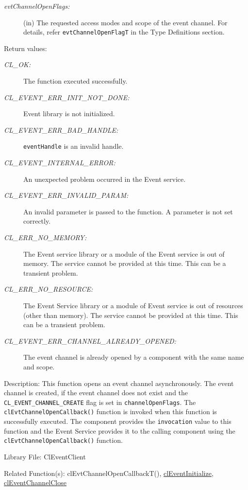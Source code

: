 \begin{flushleft}
\begin{Desc}
\begin{description}
\item[{\em evt\-Channel\-Open\-Flags:}](in) The requested access modes and scope of the event channel. For details, refer {\tt{evtChannelOpenFlagT}} in 
the Type Definitions section.
\end{description}
\end{Desc}
\begin{Desc}
\item[Return values:]
\begin{description}
\item[{\em CL\_\-OK:}]The function executed successfully. 
\item[{\em CL\_\-EVENT\_\-ERR\_\-INIT\_\-NOT\_\-DONE:}]Event library is not initialized. 
\item[{\em CL\_\-EVENT\_\-ERR\_\-BAD\_\-HANDLE:}]{\tt{eventHandle}} is an invalid handle.
\item[{\em CL\_\-EVENT\_\-INTERNAL\_\-ERROR:}]An unexpected problem occurred in the Event service. 
\item[{\em CL\_\-EVENT\_\-ERR\_\-INVALID\_\-PARAM:}]An invalid parameter is passed to the function. A parameter is not set correctly.
\item[{\em CL\_\-ERR\_\-NO\_\-MEMORY:}]The Event service library or a module of the Event service is out of memory. The service cannot be 
provided at this time. This can be a transient problem.
\item[{\em CL\_\-ERR\_\-NO\_\-RESOURCE:}]The Event Service library or a module of Event service is out of resources (other than memory).
The service cannot be provided at this time. This can be a transient problem.
\item[{\em CL\_\-EVENT\_\-ERR\_\-CHANNEL\_\-ALREADY\_\-OPENED:}]The event channel is already opened by a component with the same name and scope.
\end{description}
\end{Desc}
\begin{Desc}
\item[Description:]This function opens an event channel asynchronously. The event channel is created, if the event channel does not exist and the 
{\tt{CL\_\-EVENT\_\-CHANNEL\_\-CREATE}} flag is set in {\tt{channelOpenFlags}}. The {\tt{clEvtChannelOpenCallback()}} function is invoked when this 
function is successfully executed. The component provides the {\tt{invocation}} value to this function and the Event Service provides it to the calling
component using the {\tt{clEvtChannelOpenCallback()}} function.
\end{Desc}
\begin{Desc}
\item[Library File:]Cl\-Event\-Client\end{Desc}
\begin{Desc}
\item[Related Function(s):]cl\-Evt\-Channel\-Open\-Callback\-T(), \hyperlink{pageem101}{cl\-Event\-Initialize}, 
\hyperlink{pageem105}{cl\-Event\-Channel\-Close} \end{Desc}
\newpage



\end{flushleft}
